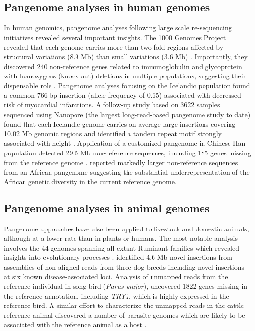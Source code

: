\documentclass[../main.tex]{subfiles}
\begin{document}
\subsection*{Pangenome analyses in human genomes}
In human genomics, pangenome analyses following large scale re-sequencing initiatives revealed several important insights. The 1000 Genomes Project revealed that each genome carries more than two-fold regions affected by structural variations (8.9 Mb) than small variations (3.6 Mb) \citep{10002015global}. Importantly, they discovered 240 non-reference genes related to immunoglobulin and glycoprotein with homozygous (knock out) deletions in multiple populations, suggesting their dispensable role \citep{sudmant2015integrated}. Pangenome analyses focusing on the Icelandic population \citep{kehr2017diversity} found a common 766 bp insertion (allele frequency of 0.65) associated with decreased risk of myocardial infarctions. A follow-up study based on 3622 samples sequenced using Nanopore (the largest long-read-based pangenome study to date) found that each Icelandic genome carries on average large insertions covering 10.02 Mb genomic regions and identified a tandem repeat motif strongly associated with height \citep{Beyter2021ng}. Application of a customized pangenome in Chinese Han population detected 29.5 Mb non-reference sequences, including 185 genes missing from the reference genome \citep{duan2019hupan}. \citet{sherman2019assembly} reported markedly larger non-reference sequences from an African pangenome suggesting the substantial underrepresentation of the African genetic diversity in the current reference genome.

\subsection*{Pangenome analyses in animal genomes}
Pangenome approaches have also been applied to livestock and domestic animals, although at a lower rate than in plants or humans. The most notable analysis involves the 44 genomes spanning all extant Ruminant families which revealed insights into evolutionary processes \citep{chen2019large}. \citet{holden2018assembly} identified 4.6 Mb novel insertions from assemblies of non-aligned reads from three dog breeds including  novel insertions at six known disease-associated loci. Analysis of unmapped reads from the reference individual in song bird (\emph{Parus major}), \citet{laine2019exploring} uncovered 1822 genes missing in the reference annotation, including \emph{TRY1}, which is highly expressed in the reference bird. A similar effort to characterize the unmapped reads in the cattle reference animal discovered a number of parasite genomes which are likely to be associated with the reference animal as a host \citep{whitacre2015s}. 
\end{document}
